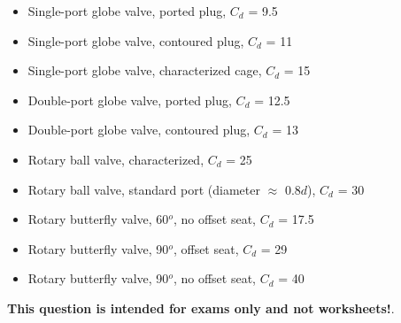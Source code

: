 \begin{itemize}
\item{} Single-port globe valve, ported plug, $C_d$ = 9.5
\item{} Single-port globe valve, contoured plug, $C_d$ = 11
\item{} Single-port globe valve, characterized cage, $C_d$ = 15
\item{} Double-port globe valve, ported plug, $C_d$ = 12.5
\item{} Double-port globe valve, contoured plug, $C_d$ = 13
\item{} Rotary ball valve, characterized, $C_d$ = 25
\item{} Rotary ball valve, standard port (diameter $\approx$ 0.8$d$), $C_d$ = 30
\item{} Rotary butterfly valve, 60$^{o}$, no offset seat, $C_d$ = 17.5
\item{} Rotary butterfly valve, 90$^{o}$, offset seat, $C_d$ = 29
\item{} Rotary butterfly valve, 90$^{o}$, no offset seat, $C_d$ = 40
\end{itemize}














{\bf This question is intended for exams only and not worksheets!}.




